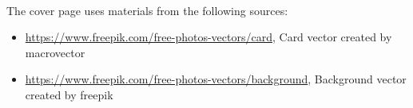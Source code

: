 \documentclass{book}
\begin{document}
\poemtitle{\textcolor[RGB]{185,25,25}{Attributions}}
\hspace*{\fill} \\
The cover page uses materials from the following sources:
\begin{itemize}
    \item \url{https://www.freepik.com/free-photos-vectors/card}, Card vector created by macrovector
    \item \url{https://www.freepik.com/free-photos-vectors/background}, Background vector created by freepik
\end{itemize}


\newpage
\begin{coverpage}
    \thispagestyle{empty}
    \noindent\fboxsep=0pt
\end{coverpage}
\end{document}
